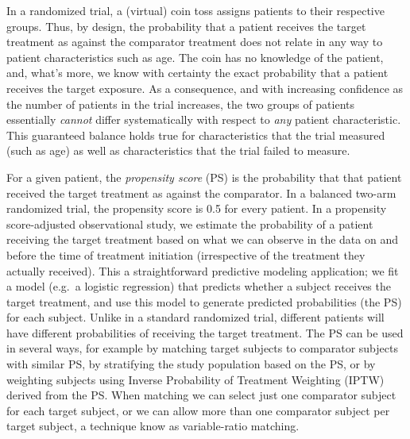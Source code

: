 \documentclass[11pt]{book}
\theoremstyle{definition}
\theoremstyle{definition}
\theoremstyle{definition}
\theoremstyle{remark}
\begin{document}

In a randomized trial, a (virtual) coin toss assigns patients to their respective groups. Thus, by design, the probability that a patient receives the target treatment as against the comparator treatment does not relate in any way to patient characteristics such as age. The coin has no knowledge of the patient, and, what's more, we know with certainty the exact probability that a patient receives the target exposure. As a consequence, and with increasing confidence as the number of patients in the trial increases, the two groups of patients essentially \emph{cannot} differ systematically with respect to \emph{any} patient characteristic. This guaranteed balance holds true for characteristics that the trial measured (such as age) as well as characteristics that the trial failed to measure. 

For a given patient, the \emph{propensity score} (PS) is the probability that that patient received the target treatment as against the comparator. \citep{rosenbaum_1983} In a balanced two-arm randomized trial, the propensity score is 0.5 for every patient. In a propensity score-adjusted observational study, we estimate the probability of a patient receiving the target treatment based on what we can observe in the data on and before the time of treatment initiation (irrespective of the treatment they actually received). This a straightforward predictive modeling application; we fit a model (e.g.~a logistic regression) that predicts whether a subject receives the target treatment, and use this model to generate predicted probabilities (the PS) for each subject. Unlike in a standard randomized trial, different patients will have different probabilities of receiving the target treatment. The PS can be used in several ways, for example by matching target subjects to comparator subjects with similar PS, by stratifying the study population based on the PS, or by weighting subjects using Inverse Probability of Treatment Weighting (IPTW) derived from the PS. When matching we can select just one comparator subject for each target subject, or we can allow more than one comparator subject per target subject, a technique know as variable-ratio matching. \citep{rassen_2012}      
\end{document}
